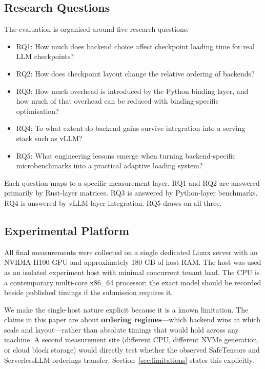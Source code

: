 \subsection{Research Questions}

The evaluation is organised around five research questions:

\begin{itemize}
\item RQ1: How much does backend choice affect checkpoint loading time for real LLM checkpoints?
\item RQ2: How does checkpoint layout change the relative ordering of backends?
\item RQ3: How much overhead is introduced by the Python binding layer, and how much of that overhead can be reduced with binding-specific optimisation?
\item RQ4: To what extent do backend gains survive integration into a serving stack such as vLLM?
\item RQ5: What engineering lessons emerge when turning backend-specific microbenchmarks into a practical adaptive loading system?
\end{itemize}

Each question maps to a specific measurement layer. RQ1 and RQ2 are answered primarily by Rust-layer matrices. RQ3 is answered by Python-layer benchmarks. RQ4 is answered by vLLM-layer integration. RQ5 draws on all three.

\subsection{Experimental Platform}

All final measurements were collected on a single dedicated Linux server with an NVIDIA H100 GPU and approximately 180 GB of host RAM. The host was used as an isolated experiment host with minimal concurrent tenant load. The CPU is a contemporary multi-core x86\_64 processor; the exact model should be recorded beside published timings if the submission requires it.

We make the single-host nature explicit because it is a known limitation. The claims in this paper are about \textbf{ordering regimes}---which backend wins at which scale and layout---rather than absolute timings that would hold across any machine. A second measurement site (different CPU, different NVMe generation, or cloud block storage) would directly test whether the observed SafeTensors and ServerlessLLM orderings transfer. Section~\ref{sec:limitations} states this explicitly.

